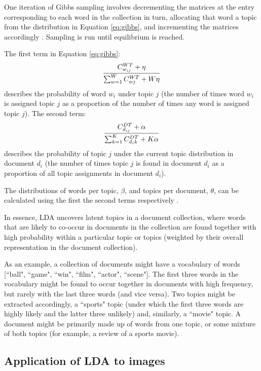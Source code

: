 One iteration of Gibbs sampling involves decrementing the matrices at the entry corresponding to each word in the collection in turn, allocating that word a topic from the distribution in Equation \ref{eq:gibbs}, and incrementing the matrices accordingly \cite{steyvers2007probabilistic}. Sampling is run until equilibrium is reached.

The first term in Equation \ref{eq:gibbs}:
\begin{align}
\frac{C_{w_{ij}}^{WT}+\eta}{\sum_{w=1}^WC_{wj}^{WT}+W\eta} \notag
\end{align}
describes the probability of word $w_i$ under topic $j$ (the number of times word $w_i$ is assigned topic $j$ as a proportion of the number of times any word is assigned topic $j$). The second term:
\begin{align}
\frac{C_{d_{ij}}^{DT}+\alpha}{\sum_{k=1}^KC_{d_{i}k}^{DT}+K\alpha} \notag
\end{align}
describes the probability of topic $j$ under the current topic distribution in document $d_i$ (the number of times topic $j$ is found in document $d_i$ as a proportion of all topic assignments in document $d_i$). 

The distributions of words per topic, $\beta$, and topics per document, $\theta$, can be calculated using the first the second terms respectively \cite{steyvers2007probabilistic}.

In essence, LDA uncovers latent topics in a document collection, where words that are likely to co-occur in documents in the collection are found together with high probability within a particular topic or topics (weighted by their overall representation in the document collection).

As an example, a collection of documents might have a vocabulary of words [``ball", ``game", ``win", ``film", ``actor", ``scene"]. The first three words in the vocabulary might be found to occur together in documents with high frequency, but rarely with the last three words (and vice versa). Two topics might be extracted accordingly, a ``sports" topic (under which the first three words are highly likely and the latter three unlikely) and, similarly, a ``movie" topic. A document might be primarily made up of words from one topic, or some mixture of both topics (for example, a review of a sports movie). 

\subsection{Application of LDA to images}

